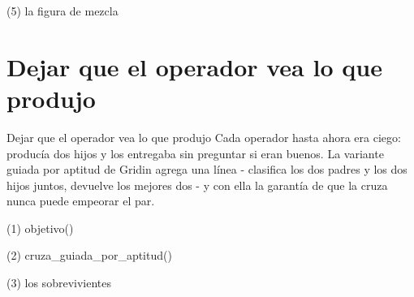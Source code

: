 \begin{frame}[fragile]{(5) la figura de mezcla}

\end{frame}


\section{Dejar que el operador vea lo que produjo}

\begin{frame}{Dejar que el operador vea lo que produjo}
Cada operador hasta ahora era ciego: producía dos hijos y los entregaba
sin preguntar si eran buenos. La variante guiada por aptitud de Gridin
agrega una línea - clasifica los dos padres y los dos hijos juntos, devuelve
los mejores dos - y con ella la garantía de que la cruza nunca puede empeorar
el par.
\end{frame}

\begin{frame}[fragile]{(1) objetivo()}

\end{frame}

\begin{frame}[fragile]{(2) cruza\_guiada\_por\_aptitud()}

\end{frame}

\begin{frame}[fragile]{(3) los sobrevivientes}

\end{frame}

